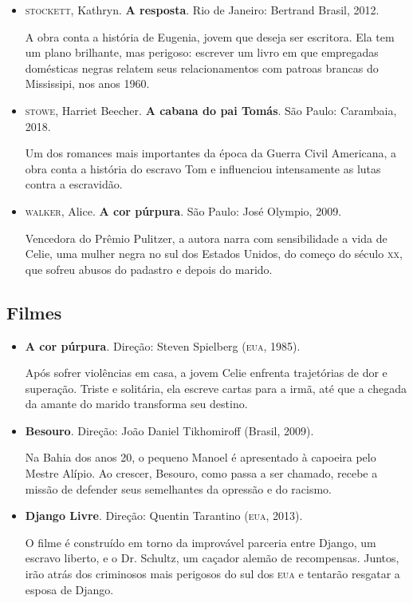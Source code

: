 \documentclass[11pt]{extarticle}
\begin{document}
\begin{enumerate}
\begin{enumerate}
\begin{enumerate}
\begin{itemize}
\item\textsc{stockett}, Kathryn. \textbf{A resposta}. Rio de Janeiro: Bertrand
  Brasil, 2012.

A obra conta a história de Eugenia, jovem que deseja ser escritora. Ela
tem um plano brilhante, mas perigoso: escrever um livro em que
empregadas domésticas negras relatem seus relacionamentos com patroas
brancas do Mississipi, nos anos 1960.

\item\textsc{stowe}, Harriet Beecher. \textbf{A cabana do pai Tomás}. São Paulo:
  Carambaia, 2018.

Um dos romances mais importantes da época da Guerra Civil Americana, a
obra conta a história do escravo Tom e influenciou intensamente as lutas
contra a escravidão.

\item\textsc{walker}, Alice. \textbf{A cor púrpura}. São Paulo: José Olympio, 2009.

Vencedora do Prêmio Pulitzer, a autora narra com sensibilidade a vida de
Celie, uma mulher negra no sul dos Estados Unidos, do começo do século
\textsc{xx}, que sofreu abusos do padastro e depois do marido.
\end{itemize}

\subsection{Filmes}

\begin{itemize}
\item\textbf{A cor púrpura}. Direção: Steven Spielberg (\textsc{eua}, 1985).

Após sofrer violências em casa, a jovem Celie enfrenta trajetórias de
dor e superação. Triste e solitária, ela escreve cartas para a irmã, até
que a chegada da amante do marido transforma seu destino.

\item\textbf{Besouro}. Direção: João Daniel Tikhomiroff (Brasil, 2009).

Na Bahia dos anos 20, o pequeno Manoel é apresentado à capoeira pelo
Mestre Alípio. Ao crescer, Besouro, como passa a ser chamado, recebe a
missão de defender seus semelhantes da opressão e do racismo.

\item\textbf{Django Livre}. Direção: Quentin Tarantino (\textsc{eua}, 2013).

O filme é construído em torno da improvável parceria entre Django, um
escravo liberto, e o Dr. Schultz, um caçador alemão de recompensas.
Juntos, irão atrás dos criminosos mais perigosos do sul dos \textsc{eua} e
tentarão resgatar a esposa de Django.


\end{itemize}
\end{enumerate}
\end{enumerate}
\end{enumerate}
\end{document}
